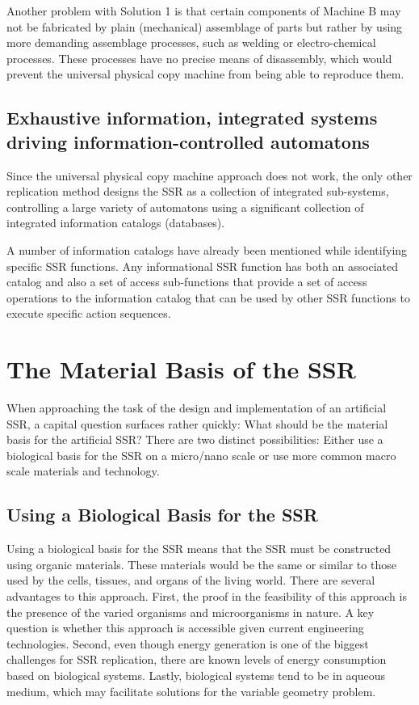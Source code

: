 Another problem with Solution 1 is that certain components of Machine B may not
be fabricated by plain (mechanical) assemblage of parts but rather by
using more demanding assemblage processes, such as welding or 
electro-chemical processes.  These processes have no precise means of disassembly,
which would prevent the universal physical copy machine from being able to reproduce
them.

\subsection[Exhaustive information, integrated systems driving information{}-controlled automatons]{Exhaustive information, integrated systems driving information-controlled automatons}

Since the universal physical copy machine approach does not work, the only
other replication method designs
the SSR as a collection of
integrated sub-systems, controlling a large variety of automatons using
a significant collection of integrated information catalogs
(databases).

A number of information catalogs have already been mentioned while identifying
specific SSR functions. Any informational SSR function has both an
associated catalog and also a set of access sub-functions that provide
a set of access operations to the information catalog that can be used
by other SSR functions to execute specific action sequences.

\section{The Material Basis of the SSR}

When approaching the task of the design and implementation of an
artificial SSR, a capital question surfaces rather quickly: What should be
the material basis for the artificial SSR? There are two distinct
possibilities: Either use a biological basis for the SSR on a micro/nano 
scale or use more common macro scale materials and technology.

\subsection{Using a Biological Basis for the SSR}

Using a biological basis for the SSR means that the SSR must be constructed using organic materials.  These materials would be the
same or similar to those used by the cells, tissues, and organs of the
living world.  There are several advantages to this approach.  First, the
proof in the feasibility of this approach is the presence of the varied organisms
and microorganisms in nature.  A key question is whether this approach is accessible given
current engineering technologies. Second, even though energy generation is one of the biggest challenges for SSR replication, there are known levels of energy consumption based on biological systems. Lastly, biological systems tend to be in aqueous medium, which may facilitate solutions for the variable geometry problem.

